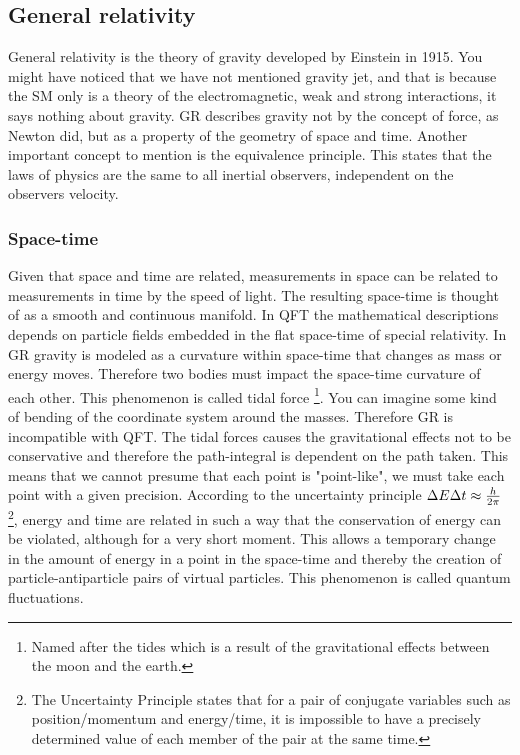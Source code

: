 \subsection{General relativity}
General relativity is the theory of gravity developed by Einstein in 1915. You might have noticed that we have not mentioned gravity jet, and that is because the SM only is a theory of the electromagnetic, weak and strong interactions, it says nothing about gravity. GR describes gravity not by the concept of force, as Newton did, but as a property of the geometry of space and time. Another important concept to mention is the equivalence principle. This states that the laws of physics are the same to all inertial observers, independent on the observers velocity.

\subsubsection{Space-time}
Given that space and time are related, measurements in space can be related to measurements in time by the speed of light. The resulting space-time is thought of as a smooth and continuous manifold. In QFT the mathematical descriptions depends on particle fields embedded in the flat space-time of special relativity. In GR gravity is modeled as a curvature within space-time that changes as mass or energy moves. Therefore two bodies must impact the space-time curvature of each other. This phenomenon is called tidal force \footnote{Named after the tides which is a result of the gravitational effects between the moon and the earth.}. You can imagine some kind of bending of the coordinate system around the masses. Therefore GR is incompatible with QFT. The tidal forces causes the gravitational effects not to be conservative and therefore the path-integral is dependent on the path taken. This means that we cannot presume that each point is "point-like", we must take each point with a given precision. According to the uncertainty principle $\Delta E \Delta t \approx {h \over 2 \pi}$ \footnote{The Uncertainty Principle states that for a pair of conjugate variables such as position/momentum and energy/time, it is impossible to have a precisely determined value of each member of the pair at the same time.}, energy and time are related in such a way that the conservation of energy can be violated, although for a very short moment. This allows a temporary change in the amount of energy in a point in the space-time and thereby the creation of particle-antiparticle pairs of virtual particles. This phenomenon is called quantum fluctuations.

